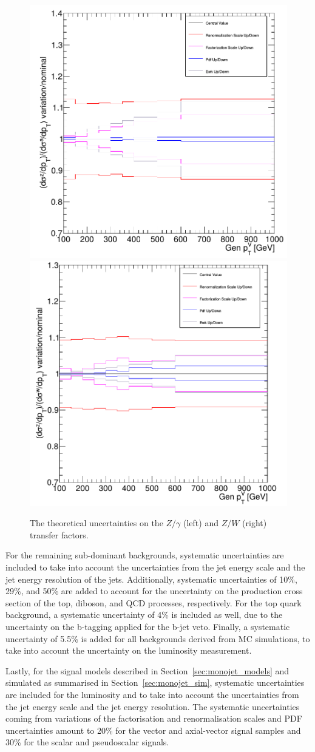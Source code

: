 \begin{figure}[ht]
  \centering
 \includegraphics[width=.49\textwidth]{syst1.png} 
 \includegraphics[width=.49\textwidth]{syst2.png}
 \caption{The theoretical uncertainties on the $Z/\gamma$ (left) and $Z/W$ (right) transfer factors.}
 \label{fig:transfer_factors_unc}
\end{figure}

For the remaining sub-dominant backgrounds, systematic uncertainties are included to take into account the uncertainties from the jet energy scale and the jet energy resolution of the jets. Additionally, systematic uncertainties  of 10\%, 29\%, and 50\% are added to account for the uncertainty on the production cross section of the top, diboson, and QCD processes, respectively. For the top quark background, a systematic uncertainty of 4\% is included as well, due to the uncertainty on the b-tagging applied for the b-jet veto. Finally, a systematic uncertainty of 5.5\% is added for all backgrounds derived from MC simulations, to take into account the uncertainty on the luminosity measurement.

Lastly, for the signal models described in Section~\ref{sec:monojet_models} and simulated as summarised in Section~\ref{sec:monojet_sim}, systematic uncertainties are included for the luminosity and to take into account the uncertainties from the jet energy scale and the jet energy resolution. The systematic uncertainties coming from variations of the factorisation and renormalisation scales and PDF uncertainties amount to 20\% for the vector and axial-vector signal samples and 30\% for the scalar and pseudoscalar signals.

